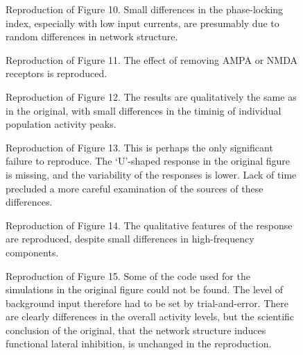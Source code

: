 \begin{figure}
    \begin{minipage}{0.48\textwidth}
        \caption{Reproduction of Figure 10.
        Small differences in the phase-locking index, especially with low input currents,
        are presumably due to random differences in network structure.}
    \end{minipage}\hfill
    \begin{minipage}{0.48\textwidth}
        \caption{Reproduction of Figure 11. The effect of removing AMPA or NMDA receptors is reproduced.}
    \end{minipage}
\end{figure}

\begin{figure}
    \begin{minipage}{0.48\textwidth}
        \caption{Reproduction of Figure 12. The results are qualitatively the same as in the original, with small differences
        in the timinig of individual population activity peaks.}
    \end{minipage}\hfill
    \begin{minipage}{0.48\textwidth}
        \caption{Reproduction of Figure 13. This is perhaps the only significant failure to reproduce. The `U'-shaped response
                 in the original figure is missing, and the variability of the responses is lower.
                 Lack of time precluded a more careful examination of the sources of these differences.}
    \end{minipage}
\end{figure}

\begin{figure}
    \begin{minipage}{0.48\textwidth}
        \caption{Reproduction of Figure 14. The qualitative features of the response are reproduced, despite small differences
        in high-frequency components.}
    \end{minipage}\hfill
    \begin{minipage}{0.48\textwidth}
        \caption{Reproduction of Figure 15. Some of the code used for the simulations in the original figure could not be found.
        The level of background input therefore had to be set by trial-and-error.
        There are clearly differences in the overall activity levels, but the scientific conclusion of the original,
        that the network structure induces functional lateral inhibition, is unchanged in the reproduction.}
    \end{minipage}
\end{figure}

